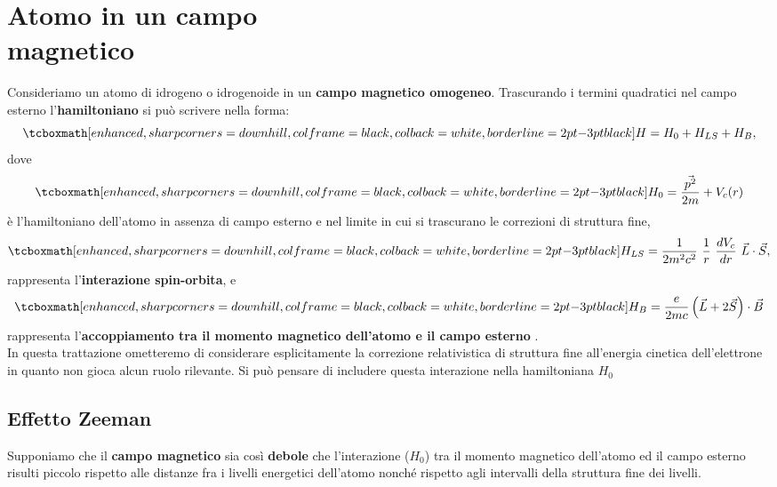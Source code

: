 \chapter[Atomo in un campo magnetico]{Atomo in un campo\\magnetico}
Consideriamo un atomo di idrogeno o idrogenoide in un \textbf{campo magnetico omogeneo}. Trascurando i termini quadratici nel campo esterno l'\textbf{hamiltoniano} si può scrivere nella forma:
	\begin{equation}
	\label{eq:cap24_1}
		\tcboxmath[enhanced, sharp corners=downhill, colframe=black, colback=white, borderline={2pt}{-3pt}{black}]{
			H=H_0+H_{LS}+H_B ,
			}
	\end{equation}
dove
	\begin{equation}
	\label{eq:cap24_2}
		\tcboxmath[enhanced, sharp corners=downhill, colframe=black, colback=white, borderline={2pt}{-3pt}{black}]{
			H_0=\frac{\vec{p^2}}{2m}+V_c(r) 
			}
	\end{equation}
è l'hamiltoniano dell'atomo in assenza di campo esterno e nel limite in cui si trascurano le correzioni di struttura fine,
	\begin{equation}
	\label{eq:cap24_3}
		\tcboxmath[enhanced, sharp corners=downhill, colframe=black, colback=white, borderline={2pt}{-3pt}{black}]{
			H_{LS}=\frac{1}{2m^2c^2} \ \frac{1}{r} \ \frac{dV_c}{dr} \ \vec{L} \cdot \vec{S} ,
			}
	\end{equation}
rappresenta l'\textbf{interazione spin-orbita}, e
	\begin{equation}
	\label{eq:cap24_4}
		\tcboxmath[enhanced, sharp corners=downhill, colframe=black, colback=white, borderline={2pt}{-3pt}{black}]{
			H_B=\frac{e}{2mc}\left( \vec{L}+2\vec{S} \right) \cdot \vec{B} 
			}
	\end{equation}
rappresenta l'\textbf{accoppiamento tra il momento magnetico dell'atomo e il campo esterno}
. \\

In questa trattazione ometteremo di considerare esplicitamente la correzione relativistica di struttura fine all'energia cinetica dell'elettrone in quanto non gioca alcun ruolo rilevante. Si può pensare di includere questa interazione nella hamiltoniana $H_0$

\section{Effetto Zeeman}
Supponiamo che il \textbf{campo magnetico} sia così \textbf{debole} che l'interazione ($H_0$) tra il momento magnetico dell'atomo ed il campo esterno risulti piccolo rispetto alle distanze fra i livelli energetici dell'atomo nonché rispetto agli intervalli della struttura fine dei livelli. \\

